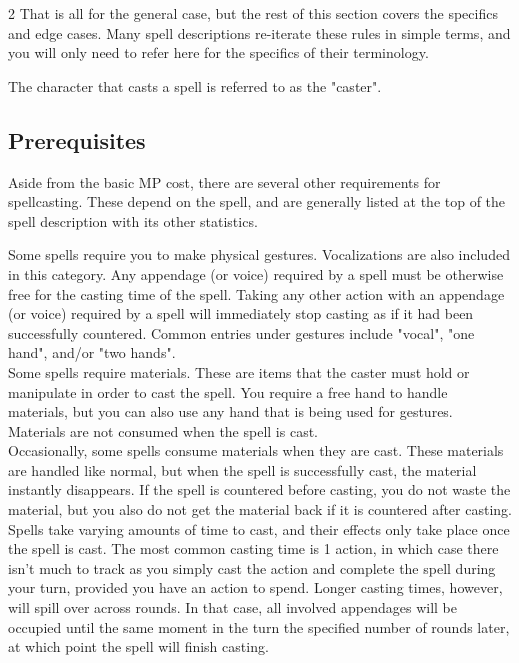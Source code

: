 \begin{multicols*}{2}
    That is all for the general case, but the rest of this section
    covers the specifics and edge cases. Many spell descriptions
    re-iterate these rules in simple terms, and you will only need
    to refer here for the specifics of their terminology.

    The character that casts a spell is referred to as the "caster".

    \subsection{Prerequisites}
    Aside from the basic MP cost, there are several other requirements
    for spellcasting. These depend on the spell, and are generally
    listed at the top of the spell description with its other
    statistics.

    {Some spells require you to make physical gestures.
    Vocalizations are also included in this category. Any appendage
    (or voice) required by a spell must be otherwise free for the
    casting time of the spell. Taking any other action with an
    appendage (or voice) required by a spell will immediately
    stop casting as if it had been successfully countered.
    Common entries under gestures include "vocal", "one hand",
    and/or "two hands".} \\
    {Some spells require materials. These are items that the caster
    must hold or manipulate in order to cast the spell. You require
    a free hand to handle materials, but you can also use any hand
    that is being used for gestures. Materials are not consumed
    when the spell is cast.} \\
    {Occasionally, some spells consume materials when they are cast.
    These materials are handled like normal, but when the spell is
    successfully cast, the material instantly disappears. If the
    spell is countered before casting, you do not waste the
    material, but you also do not get the material back if it is
    countered after casting.} \\
    {Spells take varying amounts of time to cast, and their effects
    only take place once the spell is cast. The most common casting
    time is 1 action, in which case there isn't much to track as
    you simply cast the action and complete the spell during your
    turn, provided you have an action to spend. Longer casting
    times, however, will spill over across rounds. In that case,
    all involved appendages will be occupied until the same moment
    in the turn the specified number of rounds later, at which
    point the spell will finish casting.}


\end{multicols*}

